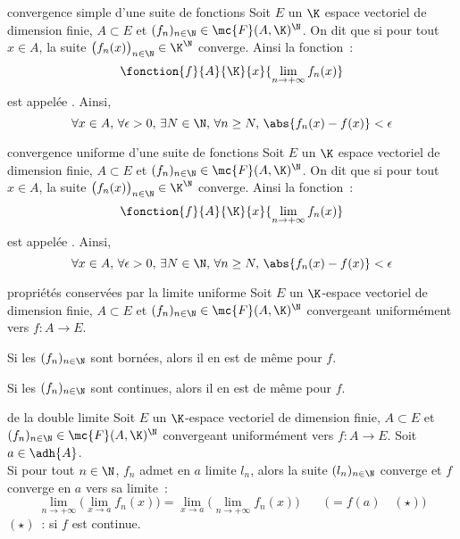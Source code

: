 

\begin{adjustwidth}{-3cm}{-3cm}


\begin{definition}{9.1}{convergence simple d'une suite de fonctions}
    Soit $E$ un $\K$ espace vectoriel de dimension finie, $A \subset E$ et $(f_n)_{n \in \N} \in \mc{F}(A,\K)^\N$. On dit que  si pour tout $x \in A$, la suite $\big(f_n(x)\big)_{n \in \N} \in \K^\N$ converge. Ainsi la fonction~:
    $$\fonction{f}{A}{\K}{x}{\lim_{n \to +\infty}f_n(x)}$$
    est appelée . Ainsi,
    $$\forall x \in A,\, \forall \epsilon >0,\, \exists N\in \N,\, \forall n \geq N,\, \abs{f_n(x) - f(x)} < \epsilon$$
\end{definition}

\begin{definition}{9.4}{convergence uniforme d'une suite de fonctions}
    Soit $E$ un $\K$ espace vectoriel de dimension finie, $A \subset E$ et $(f_n)_{n \in \N} \in \mc{F}(A,\K)^\N$. On dit que  si pour tout $x \in A$, la suite $\big(f_n(x)\big)_{n \in \N} \in \K^\N$ converge. Ainsi la fonction~:
    $$\fonction{f}{A}{\K}{x}{\lim_{n \to +\infty}f_n(x)}$$
    est appelée . Ainsi,
    $$\forall x \in A,\, \forall \epsilon >0,\, \exists N\in \N,\, \forall n \geq N,\, \abs{f_n(x) - f(x)} < \epsilon$$
\end{definition}

\begin{theoreme}{9.15}{propriétés conservées par la limite uniforme}
    Soit $E$ un $\K$-espace vectoriel de dimension finie, $A \subset E$ et $(f_n)_{n \in \N} \in \mc{F}(A,\K)^\N$ convergeant uniformément vers $f:A\to E$.
    \begin{enumeratebf}
        \item Si les $(f_n)_{n \in \N}$ sont bornées, alors il en est de même pour $f$.
        \item Si les $(f_n)_{n \in \N}$ sont continues, alors il en est de même pour $f$.
    \end{enumeratebf}
\end{theoreme}\begin{theoreme}{9.17}{de la double limite}
    Soit $E$ un $\K$-espace vectoriel de dimension finie, $A \subset E$ et $(f_n)_{n \in \N} \in \mc{F}(A,\K)^\N$ convergeant uniformément vers $f:A\to E$. Soit $a \in \adh{A}$.\\
    Si pour tout $n \in \N$, $f_n$ admet en $a$ limite $l_n$, alors la suite $(l_n)_{n \in \N}$ converge et $f$ converge en $a$ vers sa limite~:
    $$\lim_{n \to + \infty} \Big(\lim_{x \to a} f_n(x)\Big) = \lim_{x \to a} \bigg(\lim_{n \to + \infty} f_n(x)\bigg)\qquad\Big( = f(a) \quad (\star)\Big)$$
    $(\star)$~: si $f$ est continue.
\end{theoreme}


\end{adjustwidth}
